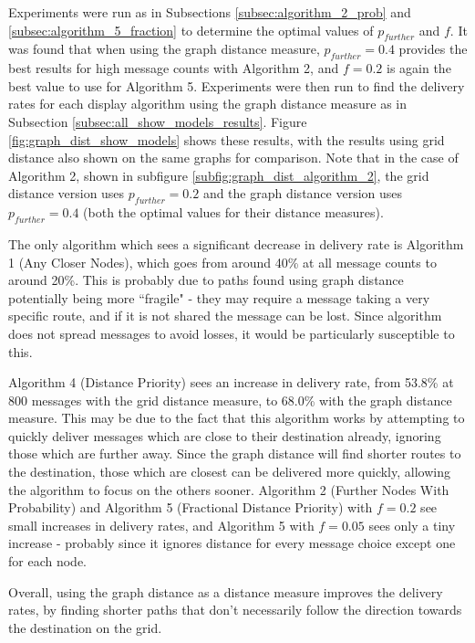 \documentclass[bsc,frontabs,twoside,singlespacing,parskip,deptreport]{infthesis}     %
\begin{document}
Experiments were run as in Subsections \ref{subsec:algorithm_2_prob} and \ref{subsec:algorithm_5_fraction} to determine the optimal values of $p_{further}$ and $f$. It was found that when using the graph distance measure, $p_{further}=0.4$ provides the best results for high message counts with Algorithm 2, and $f=0.2$ is again the best value to use for Algorithm 5. Experiments were then run to find the delivery rates for each display algorithm using the graph distance measure as in Subsection \ref{subsec:all_show_models_results}. Figure \ref{fig:graph_dist_show_models} shows these results, with the results using grid distance also shown on the same graphs for comparison. Note that in the case of Algorithm 2, shown in subfigure \ref{subfig:graph_dist_algorithm_2}, the grid distance version uses $p_{further}=0.2$ and the graph distance version uses $p_{further}=0.4$ (both the optimal values for their distance measures).

The only algorithm which sees a significant decrease in delivery rate is Algorithm 1 (Any Closer Nodes), which goes from around 40\% at all message counts to around 20\%. This is probably due to paths found using graph distance potentially being more ``fragile" - they may require a message taking a very specific route, and if it is not shared the message can be lost. Since algorithm does not spread messages to avoid losses, it would be particularly susceptible to this.

Algorithm 4 (Distance Priority) sees an increase in delivery rate, from 53.8\% at 800 messages with the grid distance measure, to 68.0\% with the graph distance measure. This may be due to the fact that this algorithm works by attempting to quickly deliver messages which are close to their destination already, ignoring those which are further away. Since the graph distance will find shorter routes to the destination, those which are closest can be delivered more quickly, allowing the algorithm to focus on the others sooner. Algorithm 2 (Further Nodes With Probability) and Algorithm 5 (Fractional Distance Priority) with $f=0.2$ see small increases in delivery rates, and Algorithm 5 with $f=0.05$ sees only a tiny increase - probably since it ignores distance for every message choice except one for each node.

Overall, using the graph distance as a distance measure improves the delivery rates, by finding shorter paths that don't necessarily follow the direction towards the destination on the grid.
\end{document}
